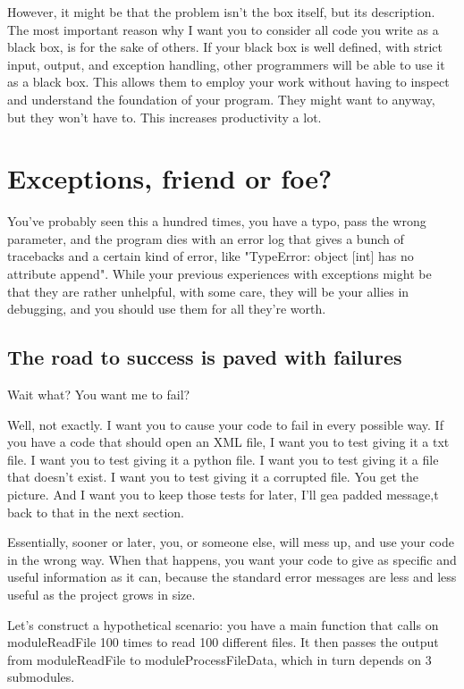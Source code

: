 \documentclass[10pt,a4paper]{article}
\begin{document}
However, it might be that the problem isn't the box itself, but its description. The most important reason why I want you to consider all code you write as a black box, is for the sake of others. If your black box is well defined, with strict input, output, and exception handling, other programmers will be able to use it as a black box. This allows them to employ your work without having to inspect and understand the foundation of your program. They might want to anyway, but they won't have to. This increases productivity a lot. 

\newpage
\section{Exceptions, friend or foe?}

You've probably seen this a hundred times, you have a typo, pass the wrong parameter, and the program dies with an error log that gives a bunch of tracebacks and a certain kind of error, like "TypeError: object [int] has no attribute append". While your previous experiences with exceptions might be that they are rather unhelpful, with some care, they will be your allies in debugging, and you should use them for all they're worth. 

\subsection{The road to success is paved with failures}

Wait what? You want me to fail?

Well, not exactly. I want you to cause your code to fail in every possible way. If you have a code that should open an XML file, I want you to test giving it a txt file. I want you to test giving it a python file. I want you to test giving it a file that doesn't exist. I want you to test giving it a corrupted file. You get the picture. And I want you to keep those tests for later, I'll gea padded message,t back to that in the next section. 

Essentially, sooner or later, you, or someone else, will mess up, and use your code in the wrong way. When that happens, you want your code to give as specific and useful information as it can, because the standard error messages are less and less useful as the project grows in size.

Let's construct a hypothetical scenario:
you have a main function that calls on moduleReadFile 100 times to read 100 different files. It then passes the output from moduleReadFile to moduleProcessFileData, which in turn depends on 3 submodules. 
\end{document}

